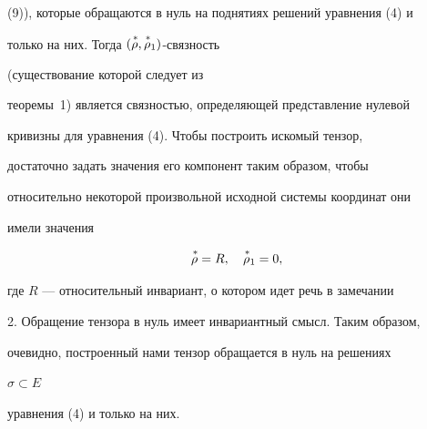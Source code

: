 (9)), которые обращаются в нуль на поднятиях решений уравнения (4) и 


только на них. Тогда $(\overset{\,*}{\rho}{},\overset{\,*}{\rho}{}_1)$-связность 


(существование которой следует из 


теоремы~1) является связностью, определяющей представление нулевой 


кривизны для уравнения (4). Чтобы построить искомый тензор, 


достаточно задать значения его компонент таким образом, чтобы 


относительно некоторой произвольной исходной системы координат они 


имели значения 


$$ 


\up{\,*}{\rho}=R,\quad \up{\,*}{\rho}_1=0, 


$$ 


где $R$ --- относительный инвариант, о котором идет речь в замечании 


2. Обращение тензора в нуль имеет инвариантный смысл. Таким образом, 


очевидно, построенный нами тензор обращается в нуль на решениях 


$\sigma\subset E$ 


уравнения (4) и только на них. 


 


 


